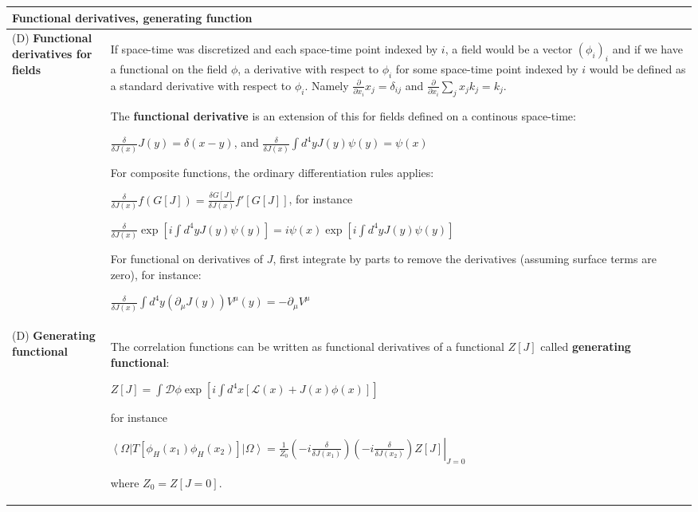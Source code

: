 \documentclass[11pt,amsmath,amssymb,latexsym]{article}
\newcommand{\toshTableBegin} 			{\begin{tabular}{|p{5cm}|p{11cm}|}}
\newcommand{\toshTableEnd} 				{\hline \end{tabular}}
\newcommand{\toshTableTitle}[1] 	{\hline \multicolumn{2}{|l|}{{\bf{#1}}}\\ \hline}
\newcommand{\toshDefinition}[2]		{\hline (D) {\bf{#1}} & {#2} \\}
\newcommand{\toshDef}[1]				{{\textbf{#1}}}
\newcommand{\toshD}							{{\mathcal{D}}}
\newcommand{\toshL}							{{\mathcal{L}}}
\newcommand{\bra}[1]{\left<{#1}\right|}
\newcommand{\ket}[1]{\left|{#1}\right>}
\begin{document}

\toshTableBegin
\toshTableTitle{Functional derivatives, generating function}
\toshDefinition{Functional derivatives for fields}{
If space-time was discretized and each space-time point indexed by $i$, a field would be a vector $(\phi_i)_i$ and if we have a functional on the field $\phi$, a derivative with respect to $\phi_i$ for some space-time point indexed by $i$ would be defined as a standard derivative with respect to $\phi_i$. Namely $\frac{\partial}{\partial x_i} x_j = \delta_{i j}$ and $\frac{\partial}{\partial x_i} \sum_j x_j k_j = k_j$.

\smallskip

The \toshDef{functional derivative} is an extension of this for fields defined on a continous space-time:

\quad $\displaystyle \frac{\delta}{\delta J(x)} J(y) = \delta(x-y)$, \quad and \quad $\displaystyle \frac{\delta}{\delta J(x)} \int d^4 y J(y)\psi(y) = \psi(x)$

\smallskip

For composite functions, the ordinary differentiation rules applies:

\quad $\displaystyle \frac{\delta}{\delta J(x)} f(G[ J]) =  \frac{\delta G[J] }{\delta J(x)} f'[G[J]]$, for instance

\quad $\displaystyle \frac{\delta}{\delta J(x)} \exp\left[i\int d^4 y J(y)\psi(y)\right] = i\psi(x)\exp\left[i\int d^4 y J(y)\psi(y)\right]$

\smallskip

For functional on derivatives of $J$, first integrate by parts to remove the derivatives (assuming surface terms are zero), for instance:

\quad $\displaystyle \frac{\delta}{\delta J(x)} \int d^4 y (\partial_\mu J(y)) V^\mu(y) = - \partial_\mu V^\mu$

}
\toshDefinition{Generating functional}{The correlation functions can be written as functional derivatives of a functional $Z[J]$ called \toshDef{generating functional}:

\quad $\displaystyle Z[J] = \int\toshD\phi \exp\left[ i\int d^4 x [\toshL(x) + J(x)\phi(x)]\right]$

for instance

 $\displaystyle \bra{\Omega} T\left[ \phi_H(x_1)\phi_H(x_2) \right]\ket{\Omega} = \frac{1}{Z_0} \left.\left(-i\frac{\delta}{\delta J(x_1)}\right)\left(-i\frac{\delta}{\delta J(x_2)}\right) Z[J]\right|_{J=0}$

where $Z_0 = Z[J=0]$.
}
\toshTableEnd
\bigskip
\end{document}
